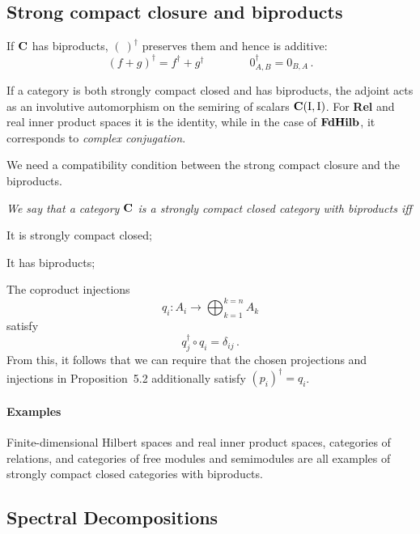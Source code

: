 \documentclass[10pt]{article}
\begin{document}
\subsection{Strong compact closure and biproducts}

\begin{proposition}
If $\mathbf{C}$ has biproducts, $(\
)^{\dagger}$ preserves them and hence is additive:
\[ 
(f + g)^{\dagger} = f^{\dagger} + g^{\dagger} \qquad\qquad 0^{\dagger}_{A,B} = 0_{B,A}\,. 
\]
\end{proposition}

If a category is both strongly compact
closed and has biproducts, the adjoint acts as an  involutive automorphism  on the semiring of
scalars
$\mathbf{C} ({\rm I}  , {\rm I} )$. For \textbf{Rel} and real inner product spaces it is the
identity, while in the case of $\mathbf{FdHilb}$, it corresponds to \emph{complex conjugation}.

We need a compatibility condition between the strong compact closure and the biproducts.
\begin{definition}\em
We say that a category $\mathbf{C}$ is a \em strongly compact closed category with biproducts \em iff
\ben
\item It is strongly compact closed;
\item It has biproducts;
\item The coproduct injections 
\[
q_i: A_i\to \bigoplus_{k=1}^{k=n}A_k
\]
satisfy 
\[
q_j^\dagger\circ q_i=\delta_{ij}\,.
\]
From this, it follows that  we can require that the chosen projections and
injections in Proposition~5.2 additionally satisfy $(p_i)^{\dagger}=q_i$.
\een
\end{definition}

\paragraph{Examples}
Finite-dimensional Hilbert spaces and real inner product spaces, categories of relations, and categories of free modules and semimodules are all examples of strongly compact closed categories with biproducts.

\subsection{Spectral Decompositions}
\end{document}
